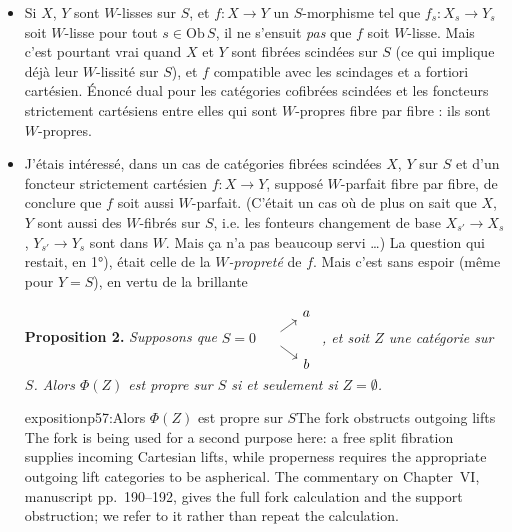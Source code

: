 \begin{itemize}[leftmargin=5em,labelsep=0.5em]
\item[1°)] Si $X$, $Y$ sont $W$-lisses sur $S$, et $f : X \longrightarrow Y$ un $S$-morphisme tel que $f_s : X_s \longrightarrow Y_s$ soit $W$-lisse pour tout $s \in \mathrm{Ob}\,S$, il ne s'ensuit \textit{pas} que $f$ soit $W$-lisse. Mais c'est pourtant vrai quand $X$ et $Y$ sont fibrées scindées sur $S$ (ce
qui implique déjà leur $W$-lissité sur $S$), et $f$ compatible avec les scindages et a fortiori cartésien. Énoncé dual pour les catégories cofibrées scindées et les foncteurs strictement cartésiens entre elles qui sont $W$-propres fibre par fibre : ils sont $W$-propres.

\item[2°)] J'étais intéressé, dans un cas de catégories fibrées scindées $X$, $Y$ sur $S$ et d'un foncteur strictement cartésien $f : X \longrightarrow Y$, supposé $W$-parfait fibre par fibre, de conclure que $f$ soit aussi $W$-parfait. (C'était un cas où de plus on sait que $X$, $Y$ sont aussi des $W$-fibrés sur $S$, i.e. les fonteurs changement de base $X_{s'} \longrightarrow X_s$, $Y_{s'} \longrightarrow Y_s$ sont dans $W$. Mais ça n'a pas beaucoup servi \dots) La question qui restait, en 1°), était celle de la $W$\textit{-propreté} de $f$. Mais c'est sans espoir (même pour $Y = S$), en vertu de la brillante %

\textbf{Proposition 2.} \textit{Supposons que} $S = 0$
$\begin{tikzcd}[ampersand replacement=\&, row sep=tiny, column sep=small, baseline=(Z.base)]
\& a \\
|[alias=Z]| \phantom{0} \arrow[ur] \arrow[dr] \& \\
\& b
\end{tikzcd}$
\textit{, et soit $Z$ une catégorie sur $S$. Alors $\Phi(Z)$ est propre sur $S$ si et seulement si $Z = \emptyset$.}

\begin{dcomment}{exposition}{p57:Alors $\Phi(Z)$ est propre sur $S$}{The fork obstructs outgoing lifts}
The fork is being used for a second purpose here: a free split fibration supplies incoming Cartesian lifts, while properness requires the appropriate outgoing lift categories to be aspherical. The commentary on Chapter~VI, manuscript pp.~190--192, gives the full fork calculation and the support obstruction; we refer to it rather than repeat the calculation.


\end{dcomment}
\end{itemize}
